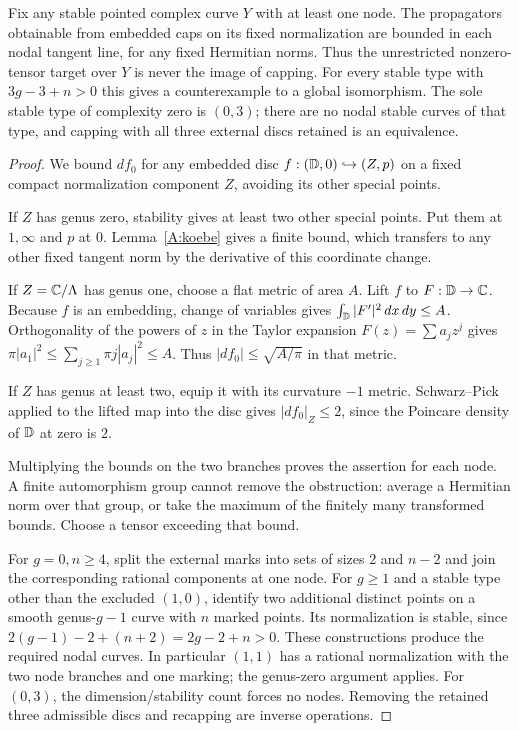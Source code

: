 \begin{theorem}\label{A:alltypes}
Fix any stable pointed complex curve $Y$ with at least one node. The
propagators obtainable from embedded caps on its fixed normalization are
bounded in each nodal tangent line, for any fixed Hermitian norms. Thus
the unrestricted nonzero-tensor target over $Y$ is never the image of
capping. For every stable type with $3g-3+n>0$ this gives a counterexample
to a global isomorphism. The sole stable type of complexity zero is
$(0,3)$; there are no nodal stable curves of that type, and capping with
all three external discs retained is an equivalence.
\end{theorem}
\begin{proof}
We bound $df_0$ for any embedded disc $f:({\mathbb{D}},0)\hookrightarrow(Z,p)$ on
a fixed compact normalization component $Z$, avoiding its other special
points.

If $Z$ has genus zero, stability gives at least two other special points.
Put them at $1,\infty$ and $p$ at $0$. Lemma~\ref{A:koebe} gives a finite
bound, which transfers to any other fixed tangent norm by the derivative
of this coordinate change.

If $Z={\mathbb{C}}/\Lambda$ has genus one, choose a flat metric of area $A$. Lift
$f$ to $F:{\mathbb{D}}\to{\mathbb{C}}$. Because $f$ is an embedding, change of variables
gives $\int_{\mathbb{D}}|F'|^2\,dx\,dy\leq A$. Orthogonality of the powers of
$z$ in the Taylor expansion $F(z)=\sum a_jz^j$ gives
$\pi|a_1|^2\leq\sum_{j\geq1}\pi j|a_j|^2\leq A$.
Thus $|df_0|\leq\sqrt{A/\pi}$ in that metric.

If $Z$ has genus at least two, equip it with its curvature $-1$ metric.
Schwarz--Pick applied to the lifted map into the disc gives
$|df_0|_Z\leq2$, since the Poincare density of ${\mathbb{D}}$ at zero is $2$.

Multiplying the bounds on the two branches proves the assertion for
each node. A finite automorphism group cannot remove the obstruction:
average a Hermitian norm over that group, or take the maximum of the
finitely many transformed bounds. Choose a tensor exceeding that bound.

For $g=0,n\geq4$, split the external marks into sets of sizes $2$ and
$n-2$ and join the corresponding rational components at one node. For
$g\geq1$ and a stable type other than the excluded $(1,0)$, identify two
additional distinct points on a smooth genus-$g-1$ curve with $n$ marked
points. Its normalization is stable, since
$2(g-1)-2+(n+2)=2g-2+n>0$. These constructions produce the required
nodal curves. In particular $(1,1)$ has a rational normalization with
the two node branches and one marking; the genus-zero argument applies.
For $(0,3)$, the dimension/stability count forces no nodes. Removing
the retained three admissible discs and recapping are inverse operations.
\end{proof}

